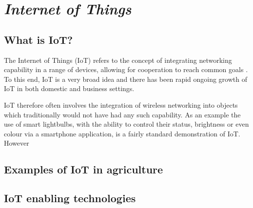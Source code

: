 \section{\emph{Internet of Things}}

\subsection{What is IoT?}

The Internet of Things (IoT) refers to the concept of integrating
networking capability in a range of devices, allowing for cooperation to reach
common goals \cite{atzori2010}. To this end, IoT is a very broad idea and there
has been rapid ongoing growth of IoT in both domestic and business settings.

IoT therefore often involves the integration of wireless networking into objects
which traditionally would not have had any such capability. As an example the
use of smart lightbulbs, with the ability to control their status, brightness or
even colour via a smartphone application, is a fairly standard demonstration of
IoT. However 

\subsection{Examples of IoT in agriculture}


\subsection{IoT enabling technologies}